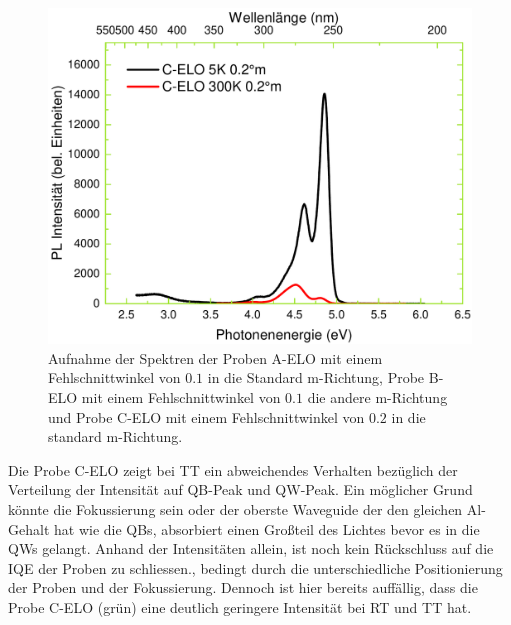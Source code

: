 \begin{figure}[htb]
\begin{minipage}[t]{0.4\textwidth}
    \includegraphics[width=\linewidth]{Bilder/TS4045/celo.pdf}
  \end{minipage}
	\caption{Aufnahme der Spektren der Proben A-ELO mit einem Fehlschnittwinkel von $0.1$ in die Standard m-Richtung, Probe B-ELO mit einem Fehlschnittwinkel von $0.1$ die andere m-Richtung und Probe C-ELO mit einem Fehlschnittwinkel von $0.2$ in die standard m-Richtung. }
	\label{fig:spectraselo}
\end{figure}
\noindent 
%
Die Probe C-ELO zeigt bei TT ein abweichendes Verhalten bezüglich der Verteilung der Intensität auf QB-Peak und QW-Peak. Ein möglicher Grund könnte die Fokussierung sein oder der oberste Waveguide der den gleichen Al-Gehalt hat wie die QBs, absorbiert einen Großteil des Lichtes bevor es in die QWs gelangt. 
Anhand der Intensitäten allein, ist noch kein Rückschluss auf die IQE der Proben zu schliessen., bedingt durch die unterschiedliche Positionierung der Proben und der Fokussierung. Dennoch ist hier bereits auffällig, dass die Probe C-ELO (grün) eine deutlich geringere Intensität bei RT und TT hat.
%
